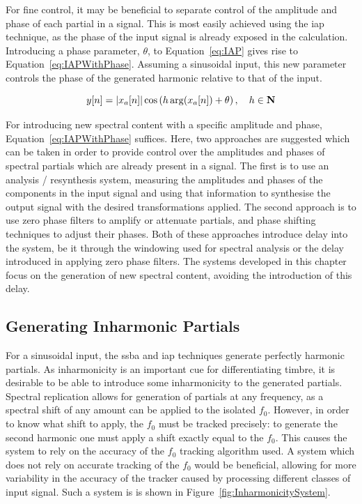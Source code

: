 		For fine control, it may be beneficial to separate control of the amplitude and phase of each partial in a
		signal. This is most easily achieved using the \acrshort{iap} technique, as the phase of the input signal
		is already exposed in the calculation. Introducing a phase parameter, $\theta$, to Equation~\ref{eq:IAP}
		gives rise to Equation~\ref{eq:IAPWithPhase}. Assuming a sinusoidal input, this new parameter controls the
		phase of the generated harmonic relative to that of the input. 

		\begin{equation}
			y[n] = \left|x_{a}[n]\right| \cos \left( h\arg(x_{a}[n]) + \theta \right), \quad h \in \textbf{N}
			\label{eq:IAPWithPhase}
		\end{equation}

		For introducing new spectral content with a specific amplitude and phase, Equation~\ref{eq:IAPWithPhase}
		suffices. Here, two approaches are suggested which can be taken in order to provide control over the
		amplitudes and phases of spectral partials which are already present in a signal. The first is to use an
		analysis / resynthesis system, measuring the amplitudes and phases of the components in the input signal
		and using that information to synthesise the output signal with the desired transformations applied.  The
		second approach is to use zero phase filters to amplify or attenuate partials, and phase shifting
		techniques to adjust their phases. Both of these approaches introduce delay into the system, be it through
		the windowing used for spectral analysis or the delay introduced in applying zero phase filters. The
		systems developed in this chapter focus on the generation of new spectral content, avoiding the
		introduction of this delay.

	\subsection{Generating Inharmonic Partials}
	\label{sec:FeatureControl-Systems-Inharmonicity}
		For a sinusoidal input, the \acrshort{ssba} and \acrshort{iap} techniques generate perfectly harmonic
		partials. As inharmonicity is an important cue for differentiating timbre, it is desirable to be able to
		introduce some inharmonicity to the generated partials. Spectral replication allows for generation of
		partials at any frequency, as a spectral shift of any amount can be applied to the isolated $f_{0}$.
		However, in order to know what shift to apply, the $f_{0}$ must be tracked precisely: to generate the
		second harmonic one must apply a shift exactly equal to the $f_{0}$. This causes the system to rely on the
		accuracy of the $f_{0}$ tracking algorithm used. A system which does not rely on accurate tracking of the
		$f_{0}$ would be beneficial, allowing for more variability in the accuracy of the tracker caused by
		processing different classes of input signal. Such a system is is shown in
		Figure~\ref{fig:InharmonicitySystem}.

